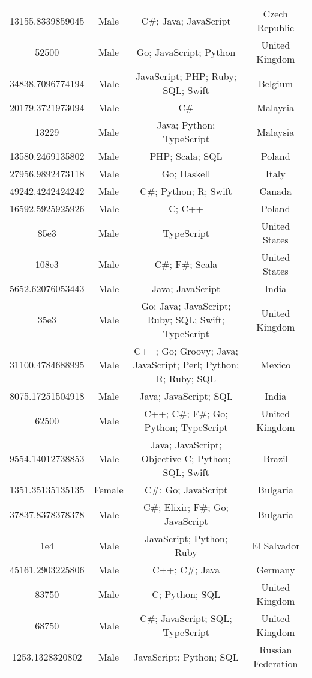 \begin{center}
\begin{tabular}{ |c|c|c|c| }
13155.8339859045  &  Male  &  C\#; Java; JavaScript  &  Czech Republic  \\ 
52500  &  Male  &  Go; JavaScript; Python  &  United Kingdom  \\ 
34838.7096774194  &  Male  &  JavaScript; PHP; Ruby; SQL; Swift  &  Belgium  \\ 
20179.3721973094  &  Male  &  C\#  &  Malaysia  \\ 
13229  &  Male  &  Java; Python; TypeScript  &  Malaysia  \\ 
13580.2469135802  &  Male  &  PHP; Scala; SQL  &  Poland  \\ 
27956.9892473118  &  Male  &  Go; Haskell  &  Italy  \\ 
49242.4242424242  &  Male  &  C\#; Python; R; Swift  &  Canada  \\ 
16592.5925925926  &  Male  &  C; C++  &  Poland  \\ 
85e3  &  Male  &  TypeScript  &  United States  \\ 
108e3  &  Male  &  C\#; F\#; Scala  &  United States  \\ 
5652.62076053443  &  Male  &  Java; JavaScript  &  India  \\ 
35e3  &  Male  &  Go; Java; JavaScript; Ruby; SQL; Swift; TypeScript  &  United Kingdom  \\ 
31100.4784688995  &  Male  &  C++; Go; Groovy; Java; JavaScript; Perl; Python; R; Ruby; SQL  &  Mexico  \\ 
8075.17251504918  &  Male  &  Java; JavaScript; SQL  &  India  \\ 
62500  &  Male  &  C++; C\#; F\#; Go; Python; TypeScript  &  United Kingdom  \\ 
9554.14012738853  &  Male  &  Java; JavaScript; Objective-C; Python; SQL; Swift  &  Brazil  \\ 
1351.35135135135  &  Female  &  C\#; Go; JavaScript  &  Bulgaria  \\ 
37837.8378378378  &  Male  &  C\#; Elixir; F\#; Go; JavaScript  &  Bulgaria  \\ 
1e4  &  Male  &  JavaScript; Python; Ruby  &  El Salvador  \\ 
45161.2903225806  &  Male  &  C++; C\#; Java  &  Germany  \\ 
83750  &  Male  &  C; Python; SQL  &  United Kingdom  \\ 
68750  &  Male  &  C\#; JavaScript; SQL; TypeScript  &  United Kingdom  \\ 
1253.1328320802  &  Male  &  JavaScript; Python; SQL  &  Russian Federation  \\ 

\end{tabular}
\end{center}

